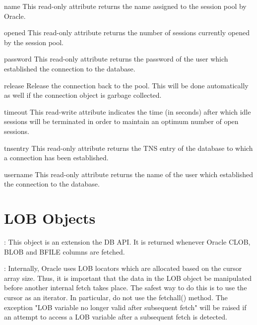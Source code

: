 \documentclass{manual}
\begin{document}
\begin{datadesc}{name}
  This read-only attribute returns the name assigned to the session pool by
  Oracle.
\end{datadesc}

\begin{datadesc}{opened}
  This read-only attribute returns the number of sessions currently opened by
  the session pool.
\end{datadesc}

\begin{datadesc}{password}
  This read-only attribute returns the password of the user which established
  the connection to the database.
\end{datadesc}

\begin{funcdesc}{release}{}
  Release the connection back to the pool. This will be done automatically as
  well if the connection object is garbage collected.
\end{funcdesc}

\begin{datadesc}{timeout}
  This read-write attribute indicates the time (in seconds) after which idle
  sessions will be terminated in order to maintain an optimum number of open
  sessions.
\end{datadesc}

\begin{datadesc}{tnsentry}
  This read-only attribute returns the TNS entry of the database to which a
  connection has been established.
\end{datadesc}

\begin{datadesc}{username}
  This read-only attribute returns the name of the user which established the
  connection to the database.
\end{datadesc}

\chapter{LOB Objects\label{lobobj}}

: This object is an extension the DB API. It is returned whenever
Oracle CLOB, BLOB and BFILE columns are fetched.

: Internally, Oracle uses LOB locators which are allocated based
on the cursor array size. Thus, it is important that the data in the LOB object
be manipulated before another internal fetch takes place. The safest way to do
this is to use the cursor as an iterator. In particular, do not use the
fetchall() method. The exception "LOB variable no longer valid after
subsequent fetch" will be raised if an attempt to access a LOB variable after
a subsequent fetch is detected.
\end{document}
